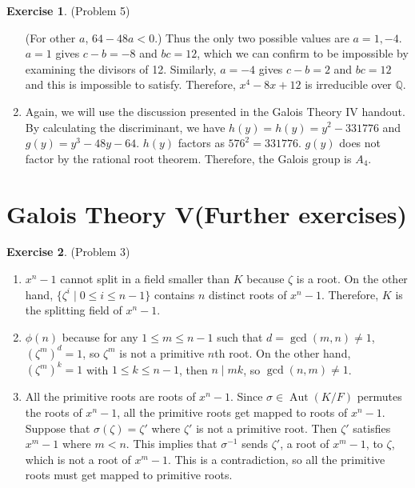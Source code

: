 \documentclass[12pt, psamsfonts]{amsart}
\theoremstyle{definition}
\newtheorem*{exer}{Exercise}
\theoremstyle{remark}
\DeclareMathOperator{\Aut}{Aut}
\numberwithin{equation}{section}
\begin{document}
\begin{exer}{(Problem 5)}
\begin{enumerate}[label=(\roman*)]
      (For other $a$, $64 - 48a < 0$.)
      Thus the only two possible values are $a = 1, -4$.
      $a = 1$ gives $c - b = -8$ and $bc = 12$, which we can confirm to be impossible by examining the divisors of 12.
      Similarly, $a = -4$ gives $c - b = 2$ and $bc = 12$ and this is impossible to satisfy.
      Therefore, $x^4 - 8x + 12$ is irreducible over $\mathbb{Q}$.
    \item
      Again, we will use the discussion presented in the Galois Theory IV handout.
      By calculating the discriminant, we have $h(y) = h(y) = y^{2} - 331776$ and $g(y) = y^{3} - 48 y - 64$.
      $h(y)$ factors as $576^2 = 331776$.
      $g(y)$ does not factor by the rational root theorem.
      Therefore, the Galois group is $A_4$.
  \end{enumerate}
\end{exer}

\section{Galois Theory V(Further exercises)}

\begin{exer}{(Problem 3)}
  \begin{enumerate}[label=(\roman*)]
    \item 
      $x^n - 1$ cannot split in a field smaller than $K$ because $\zeta$ is a root.
      On the other hand, $\{ \zeta^i \mid 0 \leq i \leq n - 1 \}$ contains $n$ distinct roots of $x^n - 1$.
      Therefore, $K$ is the splitting field of $x^n - 1$.
    \item
      $\phi(n)$ because for any $1 \leq m \leq n - 1$ such that $d = \gcd(m, n) \ne 1$, $(\zeta^m)^d = 1$, so $\zeta^m$ is not a primitive $n$th root.
      On the other hand, $(\zeta^m)^k = 1$ with $1 \leq k \leq n - 1$, then $n \mid mk$, so $\gcd(n, m) \ne 1$.
    \item
      All the primitive roots are roots of $x^n - 1$.
      Since $\sigma \in \Aut(K/F)$ permutes the roots of $x^n - 1$, all the primitive roots get mapped to roots of $x^n - 1$.
      Suppose that $\sigma(\zeta) = \zeta'$ where $\zeta'$ is not a primitive root.
      Then $\zeta'$ satisfies $x^m - 1$ where $m < n$.
      This implies that $\sigma^{-1}$ sends $\zeta'$, a root of $x^m - 1$, to $\zeta$, which is not a root of $x^m - 1$.
      This is a contradiction, so all the primitive roots must get mapped to primitive roots.
  \end{enumerate}
\end{exer}
\end{document}
